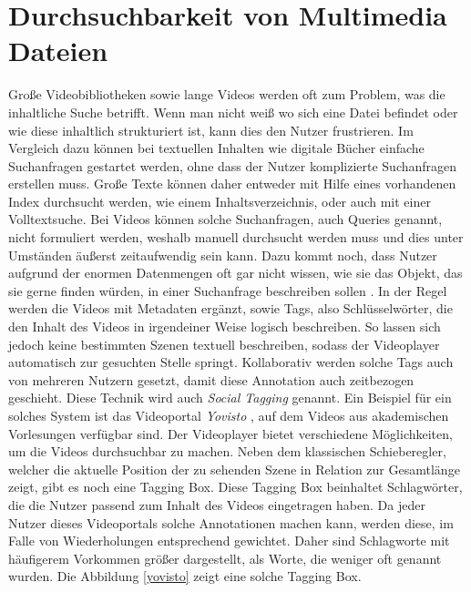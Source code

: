 \documentclass[11pt,a4paper]{report}
\begin{document}
\section{Durchsuchbarkeit von Multimedia Dateien}

Große Videobibliotheken sowie lange Videos werden oft zum Problem, was die inhaltliche Suche betrifft. Wenn man nicht weiß wo sich eine Datei befindet oder wie diese inhaltlich strukturiert ist, kann dies den Nutzer frustrieren. Im Vergleich dazu können bei textuellen Inhalten wie digitale Bücher einfache Suchanfragen gestartet werden, ohne dass der Nutzer komplizierte Suchanfragen erstellen muss. Große Texte können daher entweder mit Hilfe eines vorhandenen Index durchsucht werden, wie einem Inhaltsverzeichnis, oder auch mit einer Volltextsuche. Bei Videos können solche Suchanfragen, auch Queries genannt, nicht formuliert werden, weshalb manuell durchsucht werden muss und dies unter Umständen äußerst zeitaufwendig sein kann. Dazu kommt noch, dass Nutzer aufgrund der enormen Datenmengen oft gar nicht wissen, wie sie das Objekt, das sie gerne finden würden, in einer Suchanfrage beschreiben sollen \cite{schoeffmann20143}. In der Regel werden die Videos mit Metadaten ergänzt, sowie Tags, also Schlüsselwörter, die den Inhalt des Videos in irgendeiner Weise logisch beschreiben. So lassen sich jedoch keine bestimmten Szenen textuell beschreiben, sodass der Videoplayer automatisch zur gesuchten Stelle springt. Kollaborativ werden solche Tags auch von mehreren Nutzern gesetzt, damit diese Annotation auch zeitbezogen geschieht. Diese Technik wird auch \emph{Social Tagging} genannt. Ein Beispiel für ein solches System ist das Videoportal \emph{Yovisto} \cite{YovistoHomepage}, auf dem Videos aus akademischen Vorlesungen verfügbar sind. Der Videoplayer bietet verschiedene Möglichkeiten, um die Videos durchsuchbar zu machen. Neben dem klassischen Schieberegler, welcher die aktuelle Position der zu sehenden Szene in Relation zur Gesamtlänge zeigt, gibt es noch eine Tagging Box. Diese Tagging Box beinhaltet Schlagwörter, die die Nutzer passend zum Inhalt des Videos eingetragen haben. Da jeder Nutzer dieses Videoportals solche Annotationen machen kann, werden diese, im Falle von Wiederholungen entsprechend gewichtet. Daher sind Schlagworte mit häufigerem Vorkommen größer dargestellt, als Worte, die weniger oft genannt wurden. Die Abbildung \ref{yovisto} zeigt eine solche Tagging Box.
\end{document}
